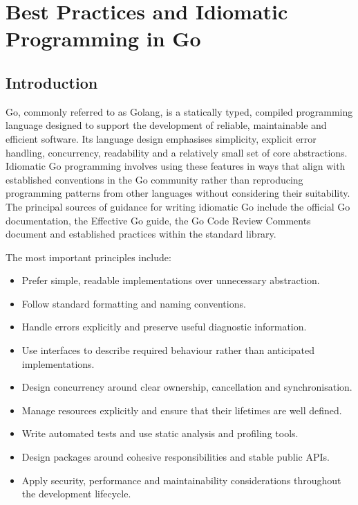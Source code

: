 \section{Best Practices and Idiomatic Programming in Go}

\subsection{Introduction}

Go, commonly referred to as Golang, is a statically typed, compiled programming language designed to support the development of reliable, maintainable and efficient software. Its language design emphasises simplicity, explicit error handling, concurrency, readability and a relatively small set of core abstractions. Idiomatic Go programming involves using these features in ways that align with established conventions in the Go community rather than reproducing programming patterns from other languages without considering their suitability.\\

The principal sources of guidance for writing idiomatic Go include the official Go documentation, the Effective Go guide, the Go Code Review Comments document and established practices within the standard library.

The most important principles include:

\begin{itemize}
    \item Prefer simple, readable implementations over unnecessary abstraction.
    \item Follow standard formatting and naming conventions.
    \item Handle errors explicitly and preserve useful diagnostic information.
    \item Use interfaces to describe required behaviour rather than anticipated implementations.
    \item Design concurrency around clear ownership, cancellation and synchronisation.
    \item Manage resources explicitly and ensure that their lifetimes are well defined.
    \item Write automated tests and use static analysis and profiling tools.
    \item Design packages around cohesive responsibilities and stable public APIs.
    \item Apply security, performance and maintainability considerations throughout the development lifecycle.
\end{itemize}

